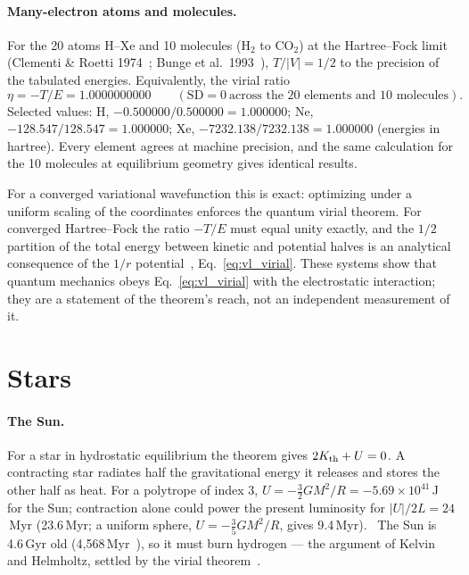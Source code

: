 \paragraph{Many-electron atoms and molecules.} For the 20 atoms H--Xe and 10 molecules (H$_2$ to CO$_2$) at the Hartree--Fock limit (Clementi \& Roetti
1974~\cite{ClementiRoetti1974}; Bunge et al.\ 1993~\cite{Bunge1993}), $T/|V|=1/2$ to the precision of the tabulated energies. Equivalently, the virial ratio
\begin{equation}
\eta=-T/E=1.0000000000\qquad(\text{SD}=0\ \text{across the 20 elements and 10 molecules}).
\end{equation}
Selected values: H, $-0.500000/0.500000=1.000000$; Ne, $-128.547/128.547=1.000000$; Xe, $-7232.138/7232.138=1.000000$ (energies in hartree). Every element
agrees at machine precision, and the same calculation for the 10 molecules at equilibrium geometry gives identical results. \calc

For a converged variational wavefunction this is exact: optimizing under a uniform scaling of the coordinates enforces the quantum virial theorem. For
converged Hartree--Fock the ratio $-T/E$ must equal unity exactly, and the $1/2$ partition of the total energy between kinetic and potential halves is an
analytical consequence of the $1/r$ potential~\cite{Clausius1870}, Eq.~\eqref{eq:vl_virial}. These systems show that quantum mechanics obeys Eq.~\eqref{eq:vl_virial} with the
electrostatic interaction; they are a statement of the theorem's reach, not an independent measurement of it.

\section{Stars}\label{sec:vl_stars}
\paragraph{The Sun.} For a star in hydrostatic equilibrium the theorem gives $2K_{\rm th}+U=0$. A contracting star radiates half the gravitational energy it
releases and stores the other half as heat. For a polytrope of index 3, $U=-\tfrac32GM^2/R=-5.69\times10^{41}$\,J for the Sun; contraction alone could power
the present luminosity for $|U|/2L=24$\,Myr (23.6\,Myr; a uniform sphere, $U=-\tfrac35GM^2/R$, gives 9.4\,Myr). \calc\ The Sun is 4.6\,Gyr old
(4,568\,Myr~\cite{Bouvier2010}), so it must burn hydrogen --- the argument of Kelvin and Helmholtz, settled by the virial theorem~\cite{Kippenhahn2012}.

